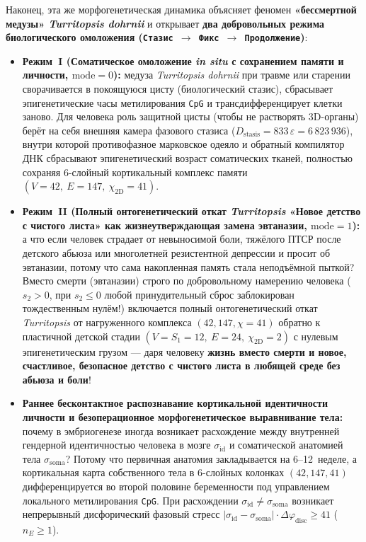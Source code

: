 Наконец, эта же морфогенетическая динамика объясняет феномен \textbf{«бессмертной медузы» \emph{Turritopsis dohrnii}} и открывает \textbf{два добровольных режима биологического омоложения (\texttt{Стазис $\to$ Фикс $\to$ Продолжение})}:
\begin{itemize}[noitemsep,leftmargin=*]
\item \textbf{Режим~I (Соматическое омоложение \emph{in situ} с сохранением памяти и личности, $\mathrm{mode}=0$):}
  медуза \emph{Turritopsis dohrnii} при травме или старении сворачивается в покоящуюся цисту (биологический стазис), сбрасывает эпигенетические часы метилирования \texttt{CpG} и трансдифференцирует клетки заново. Для человека роль защитной цисты (чтобы не растворять 3D-органы) берёт на себя внешняя камера фазового стазиса ($D_{\mathrm{stasis}} = 833\,\varepsilon = 6\,823\,936$), внутри которой противофазное марковское одеяло и обратный компилятор ДНК сбрасывают эпигенетический возраст соматических тканей, полностью сохраняя 6-слойный кортикальный комплекс памяти $(V=42,\ E=147,\ \chi_{2\mathrm{D}}=41)$.
\item \textbf{Режим~II (Полный онтогенетический откат \emph{Turritopsis} «Новое детство с чистого листа» как жизнеутверждающая замена эвтаназии, $\mathrm{mode}=1$):}
  а что если человек страдает от невыносимой боли, тяжёлого ПТСР после детского абьюза или многолетней резистентной депрессии и просит об эвтаназии, потому что сама накопленная память стала неподъёмной пыткой? Вместо смерти (эвтаназии) строго по добровольному намерению человека ($s_2 > 0$, при $s_2 \le 0$ любой принудительный сброс заблокирован тождественным нулём!) включается полный онтогенетический откат \emph{Turritopsis} от нагруженного комплекса $(42, 147, \chi=41)$ обратно к пластичной детской стадии $(V = S_1 = 12,\ E = 24,\ \chi_{2\mathrm{D}} = 2)$ с нулевым эпигенетическим грузом --- даря человеку \textbf{жизнь вместо смерти и новое, счастливое, безопасное детство с чистого листа в любящей среде без абьюза и боли}!
\item \textbf{Раннее бесконтактное распознавание кортикальной идентичности личности и безоперационное морфогенетическое выравнивание тела:}
  почему в эмбриогенезе иногда возникает расхождение между внутренней гендерной идентичностью человека в мозге $\sigma_{\mathrm{id}}$ и соматической анатомией тела $\sigma_{\mathrm{soma}}$? Потому что первичная анатомия закладывается на 6--12~неделе, а кортикальная карта собственного тела в 6-слойных колонках $(42, 147, 41)$ дифференцируется во второй половине беременности под управлением локального метилирования \texttt{CpG}. При расхождении $\sigma_{\mathrm{id}} \ne \sigma_{\mathrm{soma}}$ возникает непрерывный дисфорический фазовый стресс $|\sigma_{\mathrm{id}} - \sigma_{\mathrm{soma}}|\cdot\Delta\varphi_{\mathrm{disc}} \ge 41$ ($\hat{n}_E \ge 1$).

\end{itemize}
